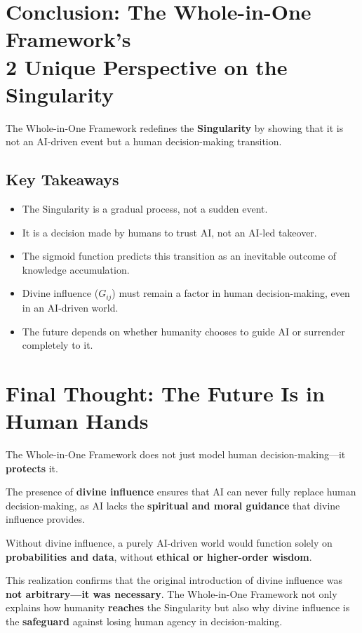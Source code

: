 \documentclass[a4]{article}
\newcommand{\bn}{\bigskip\noindent}
\begin{document}
\section{Conclusion: The Whole-in-One Framework's\\2 Unique Perspective on the Singularity}

The Whole-in-One Framework redefines the {\bf Singularity} by showing that it is not an AI-driven event but a human decision-making transition.  

\subsection*{Key Takeaways}


\begin{itemize}
\item  The Singularity is a gradual process, not a sudden event.  
\item  It is a decision made by humans to trust AI, not an AI-led takeover.  
\item  The sigmoid function predicts this transition as an inevitable outcome of knowledge accumulation.  
\item  Divine influence ($G_{ij}$) must remain a factor in human decision-making, even in an AI-driven world.  
\item  The future depends on whether humanity chooses to guide AI or surrender completely to it.  
\end{itemize}


\section*{Final Thought: The Future Is in Human Hands}

The Whole-in-One Framework does not just model human decision-making---it {\bf protects} it.  

\bn
The presence of {\bf divine influence} ensures that AI can never fully replace human decision-making, as AI lacks the {\bf spiritual and moral guidance} that divine influence provides.  

\bn
Without divine influence, a purely AI-driven world would function solely on {\bf probabilities and data}, without {\bf ethical or higher-order wisdom}.  

\bn
This realization confirms that the original introduction of divine influence was {\bf not arbitrary---it was necessary}. The Whole-in-One Framework not only explains how humanity {\bf reaches} the Singularity but also why divine influence is the {\bf safeguard} against losing human agency in decision-making.  
\end{document}
